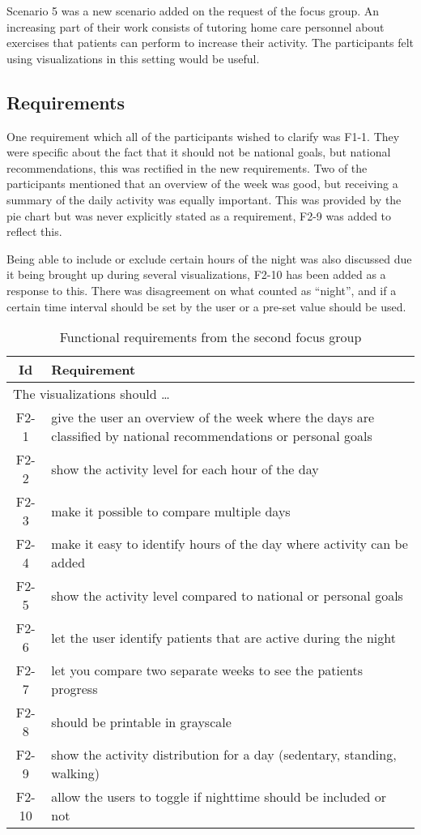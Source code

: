 Scenario 5 was a new scenario added on the request of the focus group. An increasing part of their work consists of tutoring home care personnel about exercises that patients can perform to increase their activity. The participants felt using visualizations in this setting would be useful. 

\subsection{Requirements}
One requirement which all of the participants wished to clarify was F1-1. They were specific about the fact that it should not be national goals, but national recommendations, this was rectified in the new requirements. Two of the participants mentioned that an overview of the week was good, but receiving a summary of the daily activity was equally important. This was provided by the pie chart but was never explicitly stated as a requirement, F2-9 was added to reflect this.

Being able to include or exclude certain hours of the night was also discussed due it being brought up during several visualizations, F2-10 has been added as a response to this. There was disagreement on what counted as ``night'', and if a certain time interval should be set by the user or a pre-set value should be used. 

\begin{table}[h!]
  \begin{center}
  \begin{tabular}{|c|p{12cm}|}
    \hline
      \textbf{Id} & \textbf{Requirement} \\ \hline
    \multicolumn{2}{|l|}{The visualizations should \ldots} \\ \hline
      F2-1 & give the user an overview of the week where the days are classified by national recommendations or personal goals \\ \hline
      F2-2 & show the activity level for each hour of the day \\ \hline
      F2-3 & make it possible to compare multiple days \\ \hline
      F2-4 & make it easy to identify hours of the day where activity can be added \\ \hline
      F2-5 & show the activity level compared to national or personal goals \\ \hline
      F2-6 & let the user identify patients that are active during the night \\ \hline
      F2-7 & let you compare two separate weeks to see the patients progress \\ \hline
      F2-8 & should be printable in grayscale \\ \hline
      F2-9 & show the activity distribution for a day (sedentary, standing, walking) \\ \hline
      F2-10 & allow the users to toggle if nighttime should be included or not \\ \hline
  \end{tabular}
  \end{center}
  \caption{Functional requirements from the second focus group}
\end{table}

